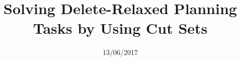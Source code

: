 \documentclass[a4paper, 10pt, oneside]{memoir}
\title				{Solving Delete-Relaxed Planning Tasks by Using Cut Sets}
\date				{13/06/2017}
\begin{document}



\def\someCommand#1#2{Args are #1 and #2}

\newtheorem{bgDef}{Definition} %
\nocite{*}

\thesisfront
\maketitle
\pagestyle{thesis}


\thesistoc
\thesismain





\thesisappendix
\thesisbib
%	
\thesisback

\end{document}
